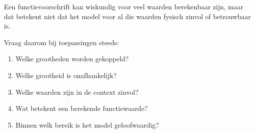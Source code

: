 \documentclass{ximera}
\begin{document}
\begin{opmerking}
Een functievoorschrift kan wiskundig voor veel waarden berekenbaar zijn,
maar dat betekent niet dat het model voor al die waarden fysisch zinvol of
betrouwbaar is.

Vraag daarom bij toepassingen steeds:

\begin{enumerate}
    \item Welke grootheden worden gekoppeld?
    \item Welke grootheid is onafhankelijk?
    \item Welke waarden zijn in de context zinvol?
    \item Wat betekent een berekende functiewaarde?
    \item Binnen welk bereik is het model geloofwaardig?
\end{enumerate}
\end{opmerking}
\end{document}
